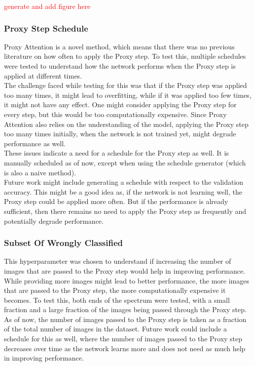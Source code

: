 \textcolor{red}{generate and add figure here}

\subsubsection{Proxy Step Schedule}
Proxy Attention is a novel method, which means that there was no previous literature on how often to apply the Proxy step. To test this, multiple schedules were tested to understand how the network performs when the Proxy step is applied at different times.\\
The challenge faced while testing for this was that if the Proxy step was applied too many times, it might lead to overfitting, while if it was applied too few times, it might not have any effect. One might consider applying the Proxy step for every step, but this would be too computationally expensive. Since Proxy Attention also relies on the understanding of the model, applying the Proxy step too many times initially, when the network is not trained yet, might degrade performance as well.\\
These issues indicate a need for a schedule for the Proxy step as well. It is manually scheduled as of now, except when using the schedule generator (which is also a naive method).\\
Future work might include generating a schedule with respect to the validation accuracy. This might be a good idea as, if the network is not learning well, the Proxy step could be applied more often. But if the performance is already sufficient, then there remains no need to apply the Proxy step as frequently and potentially degrade performance.


\subsubsection{Subset Of Wrongly Classified}
This hyperparameter was chosen to understand if increasing the number of images that are passed to the Proxy step would help in improving performance. While providing more images might lead to better performance, the more images that are passed to the Proxy step, the more computationally expensive it becomes. To test this, both ends of the spectrum were tested, with a small fraction and a large fraction of the images being passed through the Proxy step.\\
As of now, the number of images passed to the Proxy step is taken as a fraction of the total number of images in the dataset. Future work could include a schedule for this as well, where the number of images passed to the Proxy step decreases over time as the network learns more and does not need as much help in improving performance.

